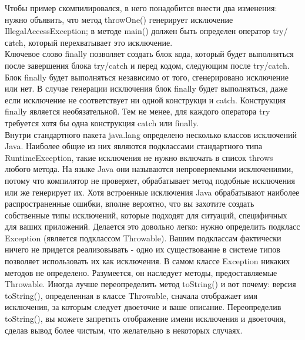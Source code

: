 Чтобы пример скомпилировался, в него понадобится внести два изменения: нужно объявить, что метод throwOne() генерирует исключение IllegalAccessException; в методе main() должен быть определен оператор try/саtch, который перехватывает это исключение. \\
Ключевое слово finally позволяет создать блок кода, который будет выполняться после завершения блока try/catch и перед кодом, следующим после try/catch. Блок finally будет выполняться независимо от того, сгенерировано исключение или нет. В случае генерации исключения блок finally будет выполняться, даже если исключение не соответствует ни одной конструкци и catch. Конструкция finally является необязательной. Тем не менее, для каждого оператора try требуется хотя бы одна конструкция catch или finally.  \\
Внутри стандартного пакета java.lang определено несколько классов исключений Java. Наиболее общие из них являются подклассами стандартного типа RuntimeException, такие исключения не нужно включать в список throws любого метода. На языке Java они называются непроверяемыми исключениями, потому что компилятор не проверяет, обрабатывает метод подобные исключения или же генерирует их. Хотя встроенные исключения Java обрабатывают наиболее распространенные ошибки, вполне вероятно, что вы захотите создать собственные типы исключений, которые подходят для ситуаций, специфичных для ваших приложений. Делается это довольно легко: нужно определить подкласс Exception (является подклассом Throwable). Вашим подклассам фактически ничего не придется реализовывать - одно их существование в системе типов позволяет использовать их как исключения. В самом классе Exception никаких методов не определено. Разумеется, он наследует методы, предоставляемые Throwable. Иногда лучше переопределить метод toString() и вот почему: версия toString(), определенная в классе Throwable, сначала отображает имя исключения, за которым следует двоеточие и ваше описание. Переопределив toString(), вы можете запретить отображение имени исключения и двоеточия, сделав вывод более чистым, что желательно в некоторых случаях. 
